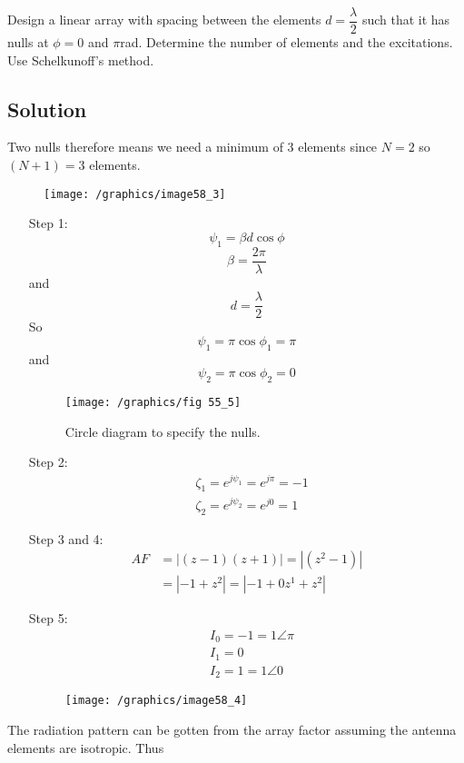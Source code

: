 \begin{exmp}
 Design a linear array with spacing between the elements  $d=\dfrac{\lambda}{2}$ such that it has nulls at $\phi=0$ and $\pi$rad. Determine the number of elements and the excitations. Use Schelkunoff's method.
\subsection*{\centering Solution}
Two nulls therefore means we need a minimum of 3 elements since $N=2$ so $(N+1)=3$ elements.
\begin{figure}[h]
 \centering
\texttt{[image: /graphics/image58\_3]}
\caption{}
\label{fig:fig}
\end{figure}
\begin{enumerate}
\item[Step 1:] $$\psi_{1}=\beta d\cos\phi$$
 $$\beta=\dfrac{2\pi}{\lambda}$$ and $$d=\dfrac{\lambda}{2}$$
So $$\psi_{1}=\pi\cos\phi_{1}=\pi$$
and $$\psi_{2}=\pi\cos\phi_{2}=0$$
\begin{figure}[h]
\centering
\texttt{[image: /graphics/fig 55\_5]}
\caption{Circle diagram to specify the nulls.}
\label{fig:fig-55_5}
\end{figure}
\item[Step 2:] \begin{align*}
&\zeta_1 = e^{j\psi_{1}}=e^{j\pi}=-1\\
&\zeta_{2} = e^{j\psi_{2}}=e^{j0}=1
\end{align*}
\item[Step 3 and 4:]  \begin{align}
AF &=|(z-1)(z+1)|=|(z^{2}-1)|\nonumber\\
&=|-1+z^{2}|=|-1+0z^{1}+z^{2}|\nonumber	  
\end{align}	    	  
\item[Step 5:]  \begin{align*}
&I_{0}=-1=1\angle\pi\\
&I_{1}=0\\
&I_{2}=1=1\angle0
\end{align*}
\begin{figure}[h]
\centering
\texttt{[image: /graphics/image58\_4]}
\label{fig:fig-55_6}
\end{figure}
\end{enumerate}
The radiation pattern can be gotten from the array factor assuming the antenna elements are isotropic. Thus


\end{exmp}
